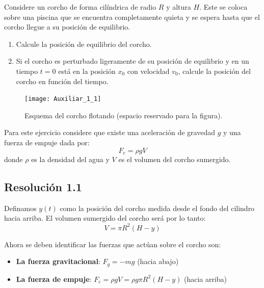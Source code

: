 \documentclass[
  11pt,
  letterpaper,
   addpoints,
   answers
  ]{exam}
\begin{document}
\begin{questions}
\question Considere un corcho de forma cilíndrica de radio $R$ y altura $H$. Este se coloca sobre una piscina que se encuentra completamente quieta y se espera hasta que el corcho llegue a su posición de equilibrio.

\begin{enumerate}
    \item Calcule la posición de equilibrio del corcho.
    \item Si el corcho es perturbado ligeramente de su posición de equilibrio y en un tiempo $t = 0$ está en la posición $x_0$ con velocidad $v_0$, calcule la posición del corcho en función del tiempo.
\end{enumerate}

\begin{figure}[h]
    \centering
    \texttt{[image: Auxiliar\_1\_1]}
    \caption{Esquema del corcho flotando (espacio reservado para la figura).}
    \label{fig:corcho}
\end{figure}

Para este ejercicio considere que existe una aceleración de gravedad $g$ y una fuerza de empuje dada por:
\begin{equation}
F_e = \rho g V
\end{equation}
donde $\rho$ es la densidad del agua y $V$ es el volumen del corcho sumergido.
\begin{solution}

\subsection*{Resolución 1.1}

Definamos $y(t)$ como la posición del corcho medida desde el fondo del cilindro hacia arriba. El volumen sumergido del corcho será por lo tanto:
\begin{equation}
V = \pi R^2 (H - y)
\end{equation}

Ahora se deben identificar las fuerzas que actúan sobre el corcho son:
\begin{itemize}
    \item \textbf{La fuerza gravitacional}: $F_g = -mg$ (hacia abajo)
    \item \textbf{La fuerza de empuje}: $F_e = \rho g V = \rho g \pi R^2 (H - y)$ (hacia arriba)
\end{itemize}


\end{solution}
\end{questions}
\end{document}
